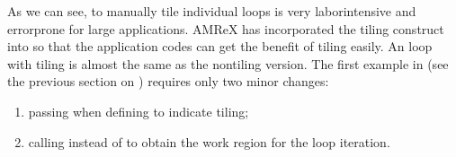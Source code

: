 \documentclass[letterpaper,10pt,english]{sphinxmanual}
\begin{document}
\sphinxAtStartPar
As we can see, to manually tile individual loops is very labor\sphinxhyphen{}intensive and
error\sphinxhyphen{}prone for large applications. AMReX has incorporated the tiling construct
into  so that the application codes can get the benefit of tiling
easily. An  loop with tiling is almost the same as the non\sphinxhyphen{}tiling
version. The first example in (see the previous section on
{\hyperref[\detokenize{Basics:sec-basics-mfiter-notiling}]{}}) requires only two minor changes:
\begin{enumerate}
%
\item {} 
\sphinxAtStartPar
passing  when defining  to indicate tiling;

\item {} 
\sphinxAtStartPar
calling  instead of  to obtain the work region
for the loop iteration.

\end{enumerate}

\begin{sphinxVerbatim}[commandchars=\\\{\}]
     
        

       \PYG{p}{[}\PYG{p}{]}
        
     
\end{sphinxVerbatim}
\end{document}
